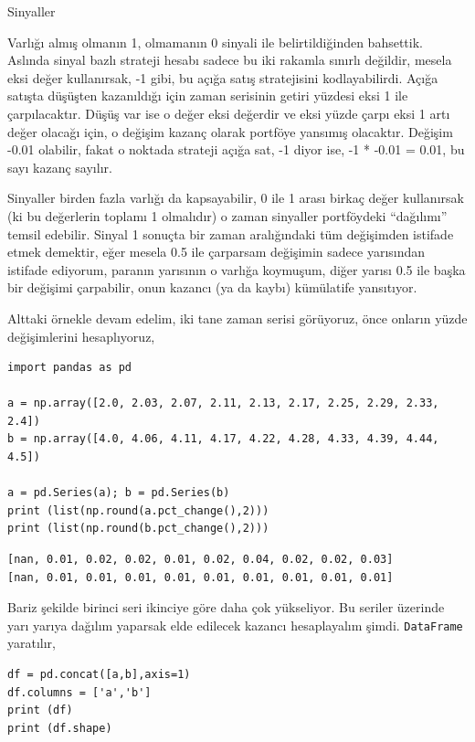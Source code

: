 \documentclass[12pt,fleqn]{article}\usepackage{../../common}
\begin{document}
Sinyaller

Varlığı almış olmanın 1, olmamanın 0 sinyali ile belirtildiğinden
bahsettik. Aslında sinyal bazlı strateji hesabı sadece bu iki rakamla sınırlı
değildir, mesela eksi değer kullanırsak, -1 gibi, bu açığa satış stratejisini
kodlayabilirdi. Açığa satışta düşüşten kazanıldığı için zaman serisinin getiri
yüzdesi eksi 1 ile çarpılacaktır. Düşüş var ise o değer eksi değerdir ve eksi
yüzde çarpı eksi 1 artı değer olacağı için, o değişim kazanç olarak portföye
yansımış olacaktır. Değişim -0.01 olabilir, fakat o noktada strateji açığa sat,
-1 diyor ise, -1 * -0.01 = 0.01, bu sayı kazanç sayılır.

Sinyaller birden fazla varlığı da kapsayabilir, 0 ile 1 arası birkaç değer
kullanırsak (ki bu değerlerin toplamı 1 olmalıdır) o zaman sinyaller portföydeki
``dağılımı'' temsil edebilir. Sinyal 1 sonuçta bir zaman aralığındaki tüm
değişimden istifade etmek demektir, eğer mesela 0.5 ile çarparsam değişimin
sadece yarısından istifade ediyorum, paranın yarısının o varlığa koymuşum, diğer
yarısı 0.5 ile başka bir değişimi çarpabilir, onun kazancı (ya da kaybı)
kümülatife yansıtıyor.

Alttaki örnekle devam edelim, iki tane zaman serisi görüyoruz, önce onların
yüzde değişimlerini hesaplıyoruz,

\begin{verbatim}
import pandas as pd

a = np.array([2.0, 2.03, 2.07, 2.11, 2.13, 2.17, 2.25, 2.29, 2.33, 2.4])
b = np.array([4.0, 4.06, 4.11, 4.17, 4.22, 4.28, 4.33, 4.39, 4.44, 4.5])

a = pd.Series(a); b = pd.Series(b)
print (list(np.round(a.pct_change(),2)))
print (list(np.round(b.pct_change(),2)))
\end{verbatim}

\begin{verbatim}
[nan, 0.01, 0.02, 0.02, 0.01, 0.02, 0.04, 0.02, 0.02, 0.03]
[nan, 0.01, 0.01, 0.01, 0.01, 0.01, 0.01, 0.01, 0.01, 0.01]
\end{verbatim}

Bariz şekilde birinci seri ikinciye göre daha çok yükseliyor. Bu seriler
üzerinde yarı yarıya dağılım yaparsak elde edilecek kazancı hesaplayalım
şimdi. \verb!DataFrame! yaratılır,

\begin{verbatim}
df = pd.concat([a,b],axis=1)
df.columns = ['a','b']
print (df)
print (df.shape)
\end{verbatim}
\end{document}
